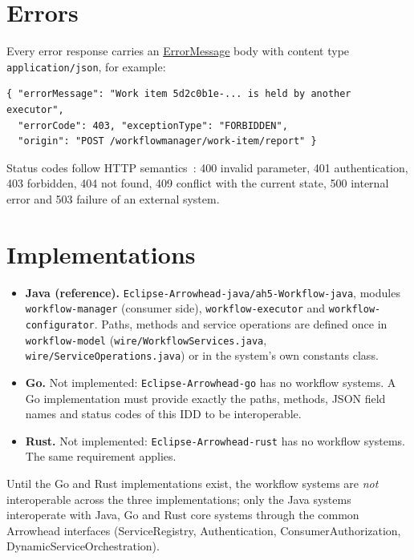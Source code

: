 \documentclass[a4paper]{arrowhead}
\newcommand{\mref}[1]{{\textcolor{ArrowheadPurple}{\hyperref[sec:model:#1]{#1}}}}
\begin{document}
\section{Errors}
\label{sec:errors}
Every error response carries an \mref{ErrorMessage} body with content type \texttt{application/\allowbreak{}json}, for example:
\begin{lstlisting}
{ "errorMessage": "Work item 5d2c0b1e-... is held by another executor",
  "errorCode": 403, "exceptionType": "FORBIDDEN",
  "origin": "POST /workflowmanager/work-item/report" }
\end{lstlisting}
Status codes follow HTTP semantics~\cite{rfc9110}: 400 invalid parameter, 401 authentication, 403 forbidden, 404 not
found, 409 conflict with the current state, 500 internal error and 503 failure of an external system.


\section{Implementations}
\label{sec:implementations}
\begin{itemize}
\item \textbf{Java (reference).} \texttt{Eclipse-\allowbreak{}Arrowhead-\allowbreak{}java/\allowbreak{}ah5-\allowbreak{}Workflow-\allowbreak{}java}, modules \texttt{workflow-\allowbreak{}manager} (consumer side), \texttt{workflow-\allowbreak{}executor} and \texttt{workflow-\allowbreak{}configurator}. Paths, methods and service
operations are defined once in \texttt{workflow-\allowbreak{}model} (\texttt{wire/\allowbreak{}Workflow\allowbreak{}Services.\allowbreak{}java}, \texttt{wire/\allowbreak{}Service\allowbreak{}Operations.\allowbreak{}java}) or in the system's own constants class.
\item \textbf{Go.} Not implemented: \texttt{Eclipse-\allowbreak{}Arrowhead-\allowbreak{}go} has no workflow systems. A Go implementation must
provide exactly the paths, methods, JSON field names and status codes of this IDD to be interoperable.
\item \textbf{Rust.} Not implemented: \texttt{Eclipse-\allowbreak{}Arrowhead-\allowbreak{}rust} has no workflow systems. The same requirement applies.
\end{itemize}
Until the Go and Rust implementations exist, the workflow systems are \emph{not} interoperable across the three
implementations; only the Java systems interoperate with Java, Go and Rust core systems through the common Arrowhead
interfaces (ServiceRegistry, Authentication, ConsumerAuthorization, DynamicServiceOrchestration).
\end{document}
